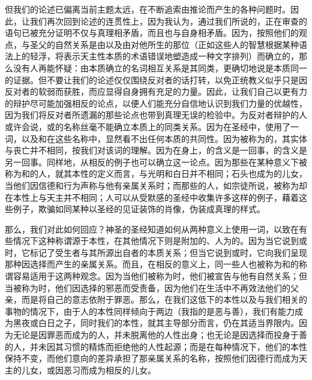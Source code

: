 但我们的论述已偏离当前主题太远，在不断追索由推论而产生的各种问题时。因此，让我们再次回到论述的连贯性上，因为我认为，通过我们所说的，正在审查的语句已被充分证明不仅与真理相矛盾，而且也与自身相矛盾。因为，按照他们的观点，与圣父的自然关系是由以及由对他所生的那位（正如这些人的智慧根据某种语法上的轻浮，将表示天主性本质的术语错误地塑造成一种文字排列）而确立的，那么没有人再能怀疑：由本质确立的名词相互关系是其同类，更确切地说是本质同一的证据。但不要让我们的论述仅仅围绕反对者的话打转，以免正统教义似乎只是因反对者的软弱而获胜，而应显得自身拥有充足的力量。因此，让我们自己以更有力的辩护尽可能加强相反的论点，以便人们能充分自信地认识到我们力量的优越性，因为我们将反对者所遗漏的那些论点也带到真理无误的检验中。为反对者辩护的人或许会说，或的名称丝毫不能确立本质上的同类关系。因为在圣经中，使用了一词，以及和在这些名称中，显然看不出任何本质的共同性。因为被称为的，其实体与丧亡并不相同，按我们对该词的理解。因为在身上，的含义是一回事，的含义是另一回事。同样地，从相反的例子也可以确立这一论点。因为那些在某种意义下被称为和的人，就其本性的定义而言，与光明和白日并不相同；石头也成为的儿女，当他们因信德和行为声称与他有亲属关系时；而那些的人，如宗徒所说，被称为却在本性上与天主并不相同；人可以从受默感的圣经中收集许多这样的例子，藉着这些例子，欺骗如同某种以圣经的见证装饰的肖像，伪装成真理的样式。\par

那么，我们对此如何回应？神圣的圣经知道如何从两种意义上使用一词，以致在有些情况下这种称谓源于本性，在其他情况下则是附加的、人为的。因为当它说到或时，它标记了受生者与其所源出自者的本质关系；但当它说到或时，它向我们呈现那种因选择而产生的亲属关系。而且，在相反的意义上，同一些人也被称为和的称谓容易适用于这两种观念。因为当他们被称为时，他们被宣告与他有自然关系；但当被称为时，他们因选择的邪恶而受责备，因为他们在生活中不再效法他们的父亲，而是将自己的意志依附于罪恶。那么，在我们这低下的本性以及与我们相关的事物的情况下，由于人的本性同样倾向于两边（我指的是恶与善），我们有能力成为黑夜或白日之子，同时我们的本性，就其主导部分而言，仍在其适当界限内。因为无论是因罪恶而成为的人，并未脱离他的人性出身；也无论是因选择而投身于善的人，并未因其习惯的精炼而拒绝他的人性起源；而是在每种情况下，他们的本性保持不变，而他们意向的差异承担了那亲属关系的名称，按照他们因德行而成为天主的儿女，或因恶习而成为相反的儿女。\par

